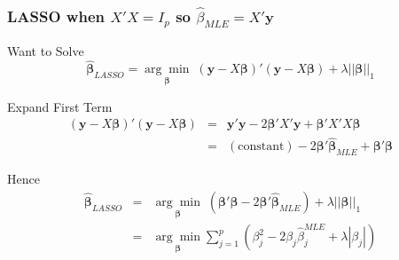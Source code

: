 \begin{frame}
  \frametitle{LASSO when $X'X= I_p$ so $\widehat{\beta}_{MLE} = X'\mathbf{y}$}

  \begin{block}{Want to Solve}
    \vspace{-1.5em}
    $$\widehat{\boldsymbol{\beta}}_{LASSO} = \underset{\boldsymbol{\beta}}{\arg \min}\; (\mathbf{y}  - X\boldsymbol{\beta})' (\mathbf{y} - X\boldsymbol{\beta}) + \lambda \left| \left| \boldsymbol{\beta}\right| \right|_1$$
  \end{block}

  \begin{block}{Expand First Term}
    \vspace{-1.5em}
	\begin{eqnarray*}
    (\mathbf{y}  - X\boldsymbol{\beta})' (\mathbf{y} - X\boldsymbol{\beta}) &=& \mathbf{y}'\mathbf{y} - 2\boldsymbol{\beta}' X' \mathbf{y} + \boldsymbol{\beta}' X'X \boldsymbol{\beta} \\
    &=& (\mbox{constant}) - 2\boldsymbol{\beta}' \widehat{\boldsymbol{\beta}}_{MLE} + \boldsymbol{\beta}'\boldsymbol{\beta}
	\end{eqnarray*}
  \end{block}

  \begin{block}{Hence}
    \vspace{-1.5em}
\begin{eqnarray*}
  \widehat{\boldsymbol{\beta}}_{LASSO} &=& \underset{\boldsymbol{\beta}}{\arg \min}\; (\boldsymbol{\beta}'\boldsymbol{\beta} - 2\boldsymbol{\beta}' \widehat{\boldsymbol{\beta}}_{MLE})  +  \lambda \left| \left| \boldsymbol{\beta}\right| \right|_1\\
  &=& \underset{\boldsymbol{\beta}}{\arg \min}  \sum_{j=1}^p \left(\beta_j^2 - 2 \beta_j \widehat{\beta}^{MLE}_j + \lambda\left|\beta_j \right|\right)
\end{eqnarray*}
    
  \end{block}
  
\end{frame}
